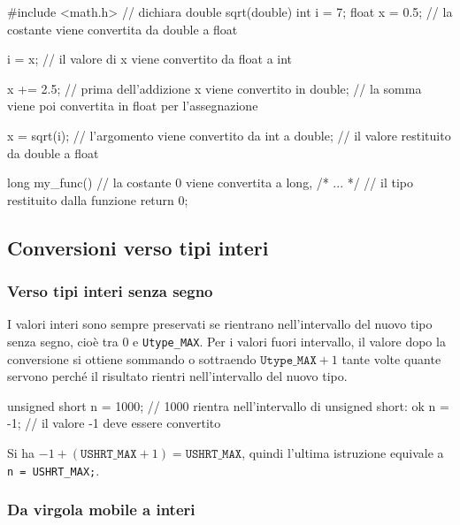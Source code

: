 \documentclass[11pt,a4paper]{article}
\begin{document}
\begin{esempio}
\begin{codice}
#include <math.h>   // dichiara double sqrt(double)
int i = 7;
float x = 0.5;      // la costante viene convertita da double a float

i = x;              // il valore di x viene convertito da float a int

x += 2.5;           // prima dell'addizione x viene convertito in double;
                    // la somma viene poi convertita in float per l'assegnazione

x = sqrt(i);        // l'argomento viene convertito da int a double;
                    // il valore restituito da double a float

long my_func() {    // la costante 0 viene convertita a long,
    /* ... */       // il tipo restituito dalla funzione
    return 0;
}
\end{codice}
\end{esempio}

\subsection{Conversioni verso tipi interi}

\subsubsection{Verso tipi interi senza segno}

I valori interi sono sempre preservati se rientrano nell'intervallo del nuovo tipo senza segno, cioè tra $0$ e \lstinline|Utype_MAX|. Per i valori fuori intervallo, il valore dopo la conversione si ottiene sommando o sottraendo $\mathtt{Utype\_MAX} + 1$ tante volte quante servono perché il risultato rientri nell'intervallo del nuovo tipo.

\begin{codice}
unsigned short n = 1000;   // 1000 rientra nell'intervallo di unsigned short: ok
n = -1;                    // il valore -1 deve essere convertito
\end{codice}

Si ha $-1 + (\mathtt{USHRT\_MAX} + 1) = \mathtt{USHRT\_MAX}$, quindi l'ultima istruzione equivale a \lstinline|n = USHRT_MAX;|.

\subsubsection{Da virgola mobile a interi}
\end{document}
